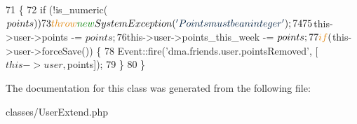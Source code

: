\begin{DoxyCode}
71     \{
72         \textcolor{keywordflow}{if} (!is\_numeric($points))
73             \textcolor{keywordflow}{throw} \textcolor{keyword}{new} SystemException(\textcolor{stringliteral}{'Points must be an integer'});
74 
75         $this->user->points -= $points;
76         $this->user->points\_this\_week -= $points;
77         \textcolor{keywordflow}{if} ($this->user->forceSave()) \{
78             Event::fire(\textcolor{stringliteral}{'dma.friends.user.pointsRemoved'}, [$this->user, $points]);
79         \}
80     \}
\end{DoxyCode}


The documentation for this class was generated from the following file\+:\begin{DoxyCompactItemize}
\item 
classes/User\+Extend.\+php\end{DoxyCompactItemize}
